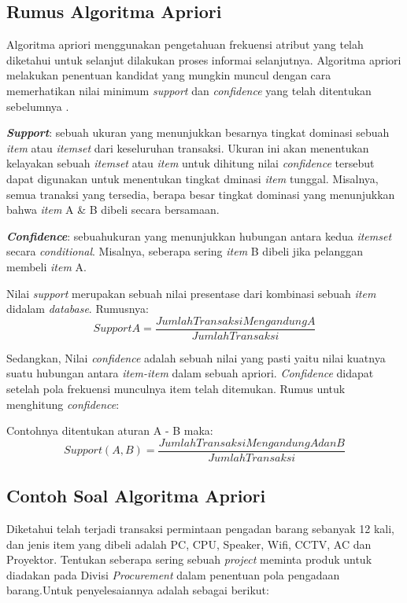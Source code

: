 \subsection{Rumus Algoritma Apriori}
\par Algoritma apriori menggunakan pengetahuan frekuensi atribut yang telah diketahui untuk selanjut dilakukan proses informai selanjutnya. Algoritma apriori melakukan penentuan kandidat yang mungkin muncul dengan cara memerhatikan nilai  minimum \textit{support} dan \textit{confidence} yang telah ditentukan sebelumnya \cite{yanto2015implementasi}.

\par 
\textbf{\textit{Support}}: sebuah ukuran yang menunjukkan besarnya tingkat dominasi sebuah \textit{item} atau \textit{itemset} dari keseluruhan transaksi. Ukuran ini akan menentukan kelayakan sebuah \textit{itemset} atau \textit{item} untuk dihitung nilai \textit{confidence} tersebut dapat digunakan untuk menentukan tingkat dminasi \textit{item} tunggal. Misalnya, semua tranaksi yang tersedia, berapa besar tingkat dominasi yang menunjukkan bahwa \textit{item} A \& B dibeli secara bersamaan.
\par
\textbf{\textit{Confidence}}: sebuahukuran yang menunjukkan hubungan antara kedua \textit{itemset} secara \textit{conditional}. Misalnya, seberapa sering \textit{item} B dibeli jika pelanggan membeli \textit{item} A.

\par
Nilai \textit{support} merupakan sebuah nilai presentase dari kombinasi sebuah \textit{item} didalam \textit{database}.
Rumusnya:
\begin{equation}
    Support A =\frac{Jumlah Transaksi Mengandung A}{Jumlah Transaksi} 
\end{equation}
\par
Sedangkan, Nilai \textit{confidence} adalah sebuah nilai yang pasti yaitu nilai kuatnya suatu hubungan antara \textit{item-item} dalam sebuah apriori. \textit{Confidence} didapat setelah pola frekuensi munculnya item telah ditemukan. Rumus untuk menghitung \textit{confidence}:
\par
Contohnya ditentukan aturan A - B maka:
 \begin{equation}
    Support (A,B) =\frac{Jumlah Transaksi Mengandung A dan B}{Jumlah Transaksi} 
\end{equation}

\subsection{Contoh Soal Algoritma Apriori}
Diketahui telah terjadi transaksi permintaan pengadan barang sebanyak 12 kali, dan jenis item yang dibeli adalah PC, CPU, Speaker, Wifi, CCTV, AC dan Proyektor. Tentukan seberapa sering sebuah \textit{project} meminta produk untuk diadakan pada Divisi \textit{Procurement} dalam penentuan pola pengadaan barang.Untuk penyelesaiannya adalah sebagai berikut:

